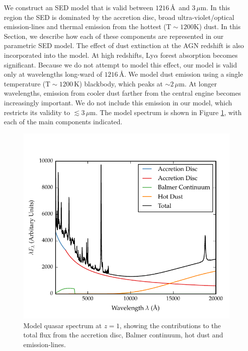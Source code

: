 We construct an SED model that is valid between $1216$\,\AA\, and $3$\,$\mu$m.
In this region the SED is dominated by the accretion disc, broad ultra-violet/optical emission-lines and thermal emission from the hottest (${\mathrm T}\sim1200$K) dust. 
In this Section, we describe how each of these components are represented in our parametric SED model.  
The effect of dust extinction at the AGN redshift is also incorporated into the model. 
At high redshifts, Ly$\alpha$ forest absorption becomes significant. 
Because we do not attempt to model this effect, our model is valid only at wavelengths long-ward of $1216$\,\AA. 
We model dust emission using a single temperature (${\mathrm T}\sim1200$\,K) blackbody, which peaks at $\sim2$\,$\mu$m. 
At longer wavelengths, emission from cooler dust farther from the central engine becomes increasingly important. 
We do not include this emission in our model, which restricts its validity to $\lesssim3$\,$\mu$m.
The model spectrum is shown in Figure \ref{fig:modelsed}, with each of the main components indicated. 

\begin{figure}[h!]
  \centering
  \includegraphics[width=\textwidth]{figures/chapter05/sed_model.pdf}
  \caption[{Model quasar spectrum at $z=1$, showing the contributions to the total flux from the accretion disc, Balmer continuum, hot dust and emission-lines.}]{Model quasar spectrum at $z=1$, showing the contributions to the total flux from the accretion disc, Balmer continuum, hot dust and emission-lines. }
  \label{fig:modelsed}
\end{figure}

